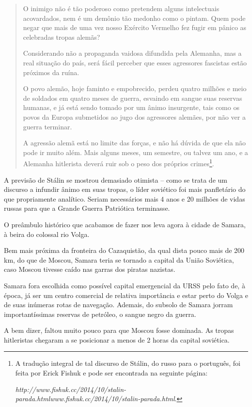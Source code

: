 \begin{quote}
O inimigo não é tão poderoso como pretendem alguns intelectuais
acovardados, nem é um demônio tão medonho como o pintam. Quem pode negar
que mais de uma vez nosso Exército Vermelho fez fugir em pânico as
celebradas tropas alemãs?

Considerando não a propaganda vaidosa difundida pela Alemanha, mas a
real situação do país, será fácil perceber que esses agressores
fascistas estão próximos da ruína.

O povo alemão, hoje faminto e empobrecido, perdeu quatro milhões e meio
de soldados em quatro meses de guerra, esvaindo em sangue suas reservas
humanas, e já está sendo tomado por um ânimo insurgente, tais como os
povos da Europa submetidos ao jugo dos agressores alemães, por não ver a
guerra terminar.

A agressão alemã está no limite das forças, e não há dúvida de que ela
não pode ir muito além. Mais alguns meses, um semestre, ou talvez um
ano, e a Alemanha hitlerista deverá ruir sob o peso dos próprios
crimes\footnote{A tradução integral de tal discurso de Stálin, do russo
  para o português, foi feita por Erick Fishuk e pode ser encontrada na
  seguinte página:

  \emph{http://www.fishuk.cc/2014/10/stalin-parada.html}{\emph{www.fishuk.cc/2014/10/stalin-parada.html}}.}.
\end{quote}

A previsão de Stálin se mostrou demasiado otimista -- como se trata de
um discurso a infundir ânimo em suas tropas, o líder soviético foi mais
panfletário do que propriamente analítico. Seriam necessários mais 4
anos e 20 milhões de vidas russas para que a Grande Guerra Patriótica
terminasse.

O preâmbulo histórico que acabamos de fazer nos leva agora à cidade de
Samara, à beira do colossal rio Volga.

Bem mais próxima da fronteira do Cazaquistão, da qual dista pouco mais
de 200 km, do que de Moscou, Samara teria se tornado a capital da União
Soviética, caso Moscou tivesse caído nas garras dos piratas nazistas.

Samara fora escolhida como possível capital emergencial da URSS pelo
fato de, à época, já ser um centro comercial de relativa importância e
estar perto do Volga e de suas inúmeras rotas de navegação. Ademais, do
subsolo de Samara jorram importantíssimas reservas de petróleo, o sangue
negro da guerra.

A bem dizer, faltou muito pouco para que Moscou fosse dominada. As
tropas hitleristas chegaram a se posicionar a menos de 2 horas da
capital soviética.


